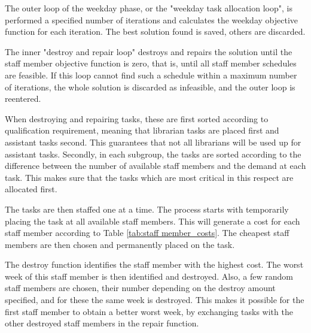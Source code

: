 The outer loop of the weekday phase, or the "weekday task allocation loop", is performed a specified number of iterations and calculates the weekday objective function for each iteration. The best solution found is saved, others are discarded. 

The inner "destroy and repair loop" destroys and repairs the solution until the staff member objective function is zero, that is, until all staff member schedules are feasible. If this loop cannot find such a schedule within a maximum number of iterations, the whole solution is discarded as infeasible, and the outer loop is reentered.

When destroying and repairing tasks, these are first sorted according to qualification requirement, meaning that librarian tasks are placed first and assistant tasks second. This guarantees that not all librarians will be used up for assistant tasks. Secondly, in each subgroup, the tasks are sorted according to the difference between the number of available staff members and the demand at each task. This makes sure that the tasks which are most critical in this respect are allocated first.

The tasks are then staffed one at a time. The process starts with temporarily placing the task at all available staff members. This will generate a cost for each staff member according to Table \ref{tab:staff member_costs}. The cheapest staff members are then chosen and permanently placed on the task.


The destroy function identifies the staff member with the highest cost. The worst week of this staff member is then identified and destroyed. Also, a few random staff members are chosen, their number depending on the destroy amount specified, and for these the same week is destroyed. This makes it possible for the first staff member to obtain a better worst week, by exchanging tasks with the other destroyed staff members in the repair function.

